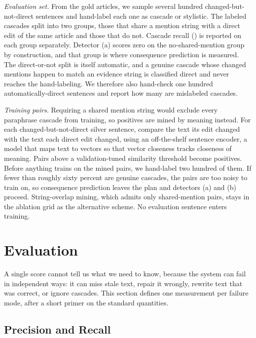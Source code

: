 \documentclass[]{paper}
\begin{document}
\emph{Evaluation set.} From the gold articles, we sample several hundred changed-but-not-direct sentences and hand-label each one as cascade or stylistic. The labeled cascades split into two groups, those that share a mention string with a direct edit of the same article and those that do not. Cascade recall () is reported on each group separately. Detector (a) scores zero on the no-shared-mention group by construction, and that group is where consequence prediction is measured. The direct-or-not split is itself automatic, and a genuine cascade whose changed mentions happen to match an evidence string is classified direct and never reaches the hand-labeling. We therefore also hand-check one hundred automatically-direct sentences and report how many are mislabeled cascades.

\emph{Training pairs.} Requiring a shared mention string would exclude every paraphrase cascade from training, so positives are mined by meaning instead. For each changed-but-not-direct silver sentence, compare the text its edit changed with the text each direct edit changed, using an off-the-shelf sentence encoder, a model that maps text to vectors so that vector closeness tracks closeness of meaning. Pairs above a validation-tuned similarity threshold become positives. Before anything trains on the mined pairs, we hand-label two hundred of them. If fewer than roughly sixty percent are genuine cascades, the pairs are too noisy to train on, so consequence prediction leaves the plan and detectors (a) and (b) proceed. String-overlap mining, which admits only shared-mention pairs, stays in the ablation grid as the alternative scheme. No evaluation sentence enters training.

\section{Evaluation}
\label{sec:eval}

A single score cannot tell us what we need to know, because the system can fail in independent ways: it can miss stale text, repair it wrongly, rewrite text that was correct, or ignore cascades. This section defines one measurement per failure mode, after a short primer on the standard quantities.

\subsection{Precision and Recall}
\label{sec:primer}
\end{document}
